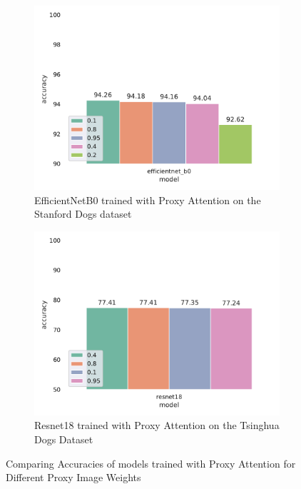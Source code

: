 \documentclass[a4paper,11pt,openright]{book}
\begin{document}
\begin{figure}[!htb]
    \begin{subfigure}[h]{.5\textwidth}
        \includegraphics[width=\linewidth, right]{results/proxy_weight_results.pdf}
        \caption{EfficientNetB0 \cite{tanEfficientnetRethinkingModel2019} trained with Proxy Attention on the Stanford Dogs dataset\cite{khoslaNovelDatasetFineGrained}}
    \end{subfigure}
    \begin{subfigure}[h]{.5\textwidth}
        \includegraphics[width=\linewidth, left]{results/proxy_weight_results_tsing.pdf}
        \caption{Resnet18 \cite{heDeepResidualLearning2016} trained with Proxy Attention on the Tsinghua Dogs Dataset \cite{zouNewDatasetDog2020}}
    \end{subfigure}
    
    \caption{Comparing Accuracies of models trained with Proxy Attention for Different Proxy Image Weights}
    \label{fig:proxy_weight}
\end{figure}
\end{document}
